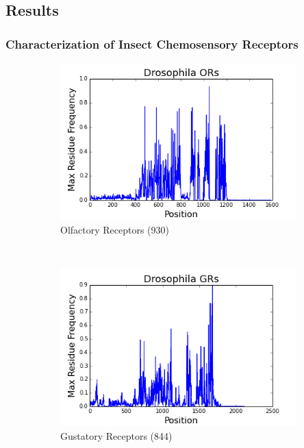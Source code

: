 \subsection{Results}

\subsubsection{Characterization of Insect Chemosensory Receptors}

\begin{figure}[H]
  \centering
  \begin{subfigure}[b]{0.45\textwidth}
    \includegraphics[width=\textwidth]{figures/chemosensory/drosophila_or_max_freq.png}
    \caption{Olfactory Receptors (930)}
    \label{fig:chemosensory:or-max-freq}
  \end{subfigure}
  ~
  \begin{subfigure}[b]{0.45\textwidth}
    \includegraphics[width=\textwidth]{figures/chemosensory/drosophila_gr_max_freq.png}
    \caption{Gustatory Receptors (844)}
    \label{fig:chemosensory:gr-max-freq}
  \end{subfigure}
\label{fig:chemosensory:max-freq}
\caption{}
\end{figure}

